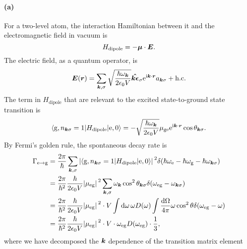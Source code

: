 \documentclass[hyperref, a4paper]{article}
\newcommand*{\ii}{\mathrm{i}}
\newcommand*{\ee}{\mathrm{e}}
\newcommand*{\omegae}{\omega_{\text{e}}}
\newcommand*{\omegag}{\omega_{\text{g}}}
\newcommand*{\omegaeg}{\omega_{\text{eg}}}
\newcommand*{\mueg}{\mu_{\text{eg}}}
\newcommand*{\muge}{\mu_{\text{ge}}}
\begin{document}
\paragraph{(a)} For a two-level atom, 
the interaction Hamiltonian between it and the electromagnetic field in vacuum is 
\begin{equation}
    H_{\text{dipole}} = - \vb*{\mu} \cdot \vb*{E}.
\end{equation}
The electric field, as a quantum operator, is 
\begin{equation}
    \vb*{E}(\vb*{r}) = \sum_{\vb*{k}, \sigma}
    \sqrt{\frac{\hbar \omega_{\vb*{k}}}{2 \epsilon_0 V}}
    \vu*{\vb*{k} \epsilon}_\sigma \ee^{\ii \vb*{k} \cdot \vb*{r}} a_{\vb*{k} \sigma} 
    + \text{h.c.}
\end{equation}
The term in $H_{\text{dipole}}$ that are relevant to 
the excited state-to-ground state transition is  
\begin{equation}
    \mel**{\text{g}, n_{\vb*{k} \sigma} = 1}{H_{\text{dipole}}}{\text{e}, 0}
    = - \sqrt{\frac{\hbar \omega_{\vb*{k}}}{2 \epsilon_0 V}} 
    \muge \ee^{\ii \vb*{k} \cdot \vb*{r}} \cos \theta_{\vb*{k} \sigma}.
\end{equation}
By Fermi's golden rule, the spontaneous decay rate is 
\begin{equation}
    \begin{aligned}
        \Gamma_{\text{e} \to \text{g}} &= 
        \frac{2\pi}{\hbar} \sum_{\vb*{k}, \sigma} 
        \abs*{
            \mel**{\text{g}, n_{\vb*{k} \sigma} = 1}{H_{\text{dipole}}}{\text{e}, 0}
        }^2
        \delta(\hbar \omegae - \hbar \omegag - \hbar \omega_{\vb*{k} \sigma}) \\
        &= \frac{2\pi}{\hbar^2} \frac{\hbar}{2 \epsilon_0 V}  \abs*{\mueg}^2 
        \sum_{\vb*{k}, \sigma} \omega_{\vb*{k}}
        \cos^2 \theta_{\vb*{k} \sigma} 
        \delta(\omegaeg - \omega_{\vb*{k} \sigma}) \\
        &= \frac{2\pi}{\hbar^2} \frac{\hbar}{2 \epsilon_0 V} \abs*{\mueg}^2 
        \cdot V \int \dd{\omega} \omega D(\omega) \int \frac{\dd{\Omega}}{4\pi} 
        \omega  \cos^2 \theta
        \delta(\omegaeg - \omega)  \\
        &= \frac{2\pi}{\hbar^2} \frac{\hbar}{2 \epsilon_0 V} \abs*{\mueg}^2 
        \cdot V \cdot \omegaeg D(\omegaeg) \cdot \frac{1}{3} ,
    \end{aligned}
\end{equation}
where we have decomposed the $\vb*{k}$ dependence 
of the transition matrix element 
\end{document}
